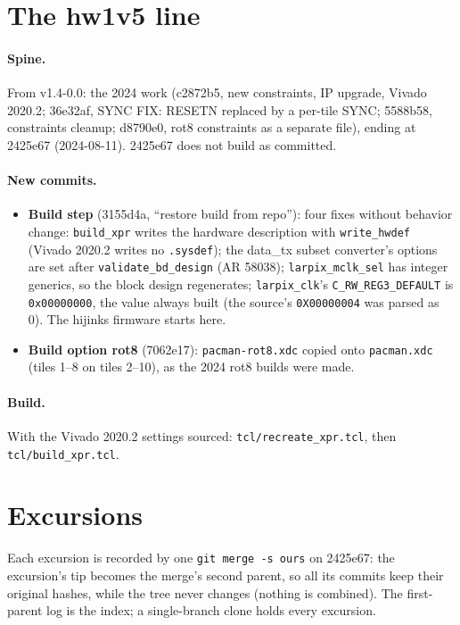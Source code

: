 \documentclass[11pt]{article}
\newcommand{\h}[1]{\texttt{#1}}
\begin{document}
\section{The hw1v5 line}

\paragraph{Spine.}  From v1.4-0.0: the 2024 work (c2872b5, new constraints, IP upgrade, Vivado 2020.2; 36e32af,
SYNC FIX: RESETN replaced by a per-tile SYNC; 5588b58, constraints cleanup; d8790e0, rot8 constraints as a
separate file), ending at 2425e67 (2024-08-11).  2425e67 does not build as committed.

\paragraph{New commits.}
\begin{itemize}
\item \textbf{Build step} (3155d4a, ``restore build from repo''): four fixes without behavior change:
  \h{build\_xpr} writes the hardware description with \h{write\_hwdef} (Vivado 2020.2 writes no \h{.sysdef});
  the data\_tx subset converter's options are set after \h{validate\_bd\_design} (AR 58038);
  \h{larpix\_mclk\_sel} has integer generics, so the block design regenerates; \h{larpix\_clk}'s
  \h{C\_RW\_REG3\_DEFAULT} is \h{0x00000000}, the value always built (the source's \h{0X00000004} was parsed as 0).
  The hijinks firmware starts here.
\item \textbf{Build option rot8} (7062e17): \h{pacman-rot8.xdc} copied onto \h{pacman.xdc} (tiles 1--8 on tiles
  2--10), as the 2024 rot8 builds were made.
\end{itemize}

\paragraph{Build.}  With the Vivado 2020.2 settings sourced: \h{tcl/recreate\_xpr.tcl}, then
\h{tcl/build\_xpr.tcl}.

\section{Excursions}

Each excursion is recorded by one \h{git merge -s ours} on 2425e67: the excursion's tip becomes the merge's second
parent, so all its commits keep their original hashes, while the tree never changes (nothing is combined).  The
first-parent log is the index; a single-branch clone holds every excursion.
\end{document}
